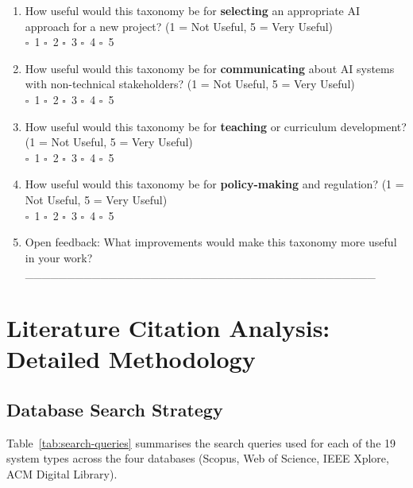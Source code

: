 \documentclass[acmlarge]{acmart}
\begin{document}
\begin{enumerate}
  \item[\textbf{Q3.1}] How useful would this taxonomy be for \textbf{selecting} an appropriate AI approach for a new project? (1 = Not Useful, 5 = Very Useful)\\
  $\square$~1 \quad $\square$~2 \quad $\square$~3 \quad $\square$~4 \quad $\square$~5

  \item[\textbf{Q3.2}] How useful would this taxonomy be for \textbf{communicating} about AI systems with non-technical stakeholders? (1 = Not Useful, 5 = Very Useful)\\
  $\square$~1 \quad $\square$~2 \quad $\square$~3 \quad $\square$~4 \quad $\square$~5

  \item[\textbf{Q3.3}] How useful would this taxonomy be for \textbf{teaching} or curriculum development? (1 = Not Useful, 5 = Very Useful)\\
  $\square$~1 \quad $\square$~2 \quad $\square$~3 \quad $\square$~4 \quad $\square$~5

  \item[\textbf{Q3.4}] How useful would this taxonomy be for \textbf{policy-making} and regulation? (1 = Not Useful, 5 = Very Useful)\\
  $\square$~1 \quad $\square$~2 \quad $\square$~3 \quad $\square$~4 \quad $\square$~5

  \item[\textbf{Q3.5}] Open feedback: What improvements would make this taxonomy more useful in your work?\\
  \_\_\_\_\_\_\_\_\_\_\_\_\_\_\_\_\_\_\_\_\_\_\_\_\_\_\_\_\_\_\_\_\_\_\_\_\_\_\_\_\_\_
\end{enumerate}


\section{Literature Citation Analysis: Detailed Methodology}
\label{app:lit-method}

\subsection{Database Search Strategy}

Table~\ref{tab:search-queries} summarises the search queries used for each of the 19 system types across the four databases (Scopus, Web of Science, IEEE Xplore, ACM Digital Library).
\end{document}
